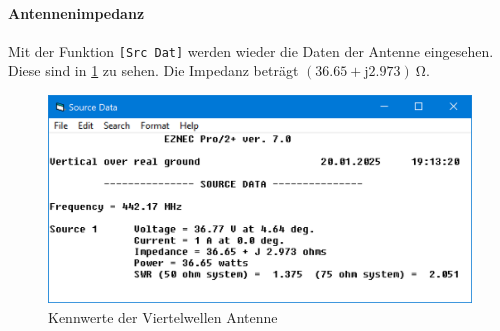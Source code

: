 \documentclass[colorlinks = true, allcolors = black, ngerman, 11pt,
a4paper, twoside, titlepage]{article}
\numberwithin{figure}{section}
\renewcommand{\si}[2]{\SI{#1}{#2}}
\begin{document}
	\paragraph{Antennenimpedanz}
	Mit der Funktion \texttt{[Src Dat]} werden wieder die Daten der Antenne eingesehen. Diese sind in \cref{fig:piuzquartwave} zu sehen. Die Impedanz beträgt $(36.65 + \mathrm{j} 2.973)\si{}{\ohm}$.
	
	\begin{figure}[h!]
		\centering
		\includegraphics[width=0.7\linewidth]{imgs/PIUZ_quartwave}
		\caption{Kennwerte der Viertelwellen Antenne}
		\label{fig:piuzquartwave}
	\end{figure}
	
	
\end{document}

